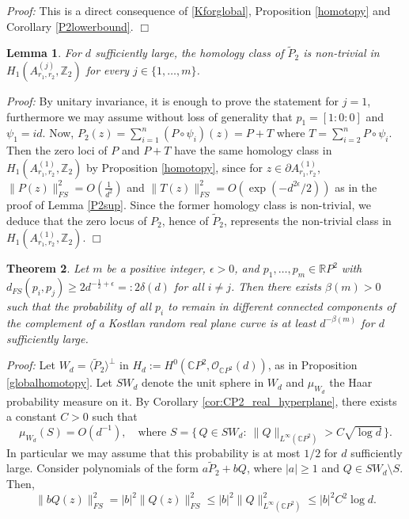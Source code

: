 \documentclass [11pt]{amsart}
\newtheorem {theorem}{Theorem}
\newtheorem {lemma}[theorem]{Lemma}
\theoremstyle{remark}
\numberwithin{equation}{section}
\numberwithin{theorem}{section}
\begin{document}
\noindent\textit{Proof:} This is a direct consequence of \eqref{Kforglobal}, Proposition \ref{homotopy}  and Corollary \ref{P2lowerbound}. \hfill $\Box$ 

\begin{lemma} \label{nontrivial}
For $d$ sufficiently large, the homology class of $\widetilde{P}_{2}$ is non-trivial in $H_{1}(A^{(j)}_{r_{1},r_{2}},\mathbb{Z}_{2})$ for every $j\in \{1,\ldots,m\}$. 
\end{lemma}

\noindent\textit{Proof:} By unitary invariance, it is enough to prove the statement for $j=1$, furthermore we may assume without loss of generality that $p_{1}=[1:0:0]$ and $\psi_{1}=id$. Now, $\displaystyle{P_{2}(z)=\sum_{i=1}^{n} (P\circ \psi_{i})(z)=P+T}$ where $\displaystyle{T=\sum_{i=2}^{n} P\circ \psi_{i}}$. Then the zero loci of $P$ and $P+T$ have the same homology class in $H_{1}(A^{(1)}_{r_{1},r_{2}},\mathbb{Z}_{2})$ by Proposition \ref{homotopy}, since for $z\in \partial A^{(1)}_{r_{1},r_{2}}$, $\displaystyle{\|P(z)\|_{FS}^2=O\left(\frac{1}{d^2}\right)}$ and $\displaystyle{\|T(z)\|_{FS}^2=O\left(\exp(-d^{2\epsilon}/2)\right)}$ as in the proof of Lemma \ref{P2sup}. Since the former homology class is non-trivial, we deduce that the zero locus of $P_{2}$, hence of $\widetilde{P}_{2}$, represents the non-trivial class in $H_{1}(A^{(1)}_{r_{1},r_{2}},\mathbb{Z}_{2})$. \hfill $\Box$

\begin{theorem} \label{finitelymanypoints}
Let $m$ be a positive integer, $\epsilon>0$, and $\displaystyle{p_{1},\ldots,p_{m}\in \mathbb{R}P^2}$ with $\displaystyle{d_{FS}(p_{i},p_{j})\geq 2d^{-\frac{1}{2}+\epsilon}=:2\delta(d)}$ for all $i\neq j$. Then there exists $\beta(m)>0$ such that the probability of all $p_{i}$ to remain in different connected components of the complement of a Kostlan random real plane curve is at least $\displaystyle{d^{-\beta(m)}}$ for $d$ sufficiently large. 
\end{theorem}

\noindent \textit{Proof:} Let $W_{d}=\langle \widetilde{P}_{2}\rangle^{\perp}$ in $H_d:=H^0(\mathbb{C}P^2,\mathcal{O}_{\mathbb{C}P^2}(d))$, as in Proposition \ref{globalhomotopy}. Let $SW_{d}$ denote the unit sphere in $W_{d}$ and $\mu_{W_{d}}$ the Haar probability measure on it. By Corollary \ref{cor:CP2_real_hyperplane}, there exists a constant $C>0$ such that 
\[ \mu_{W_d}(S)
=O(d^{-1}), \quad \mathrm{where}\, \, S=\Big\{\,Q\in SW_d:\ \|Q\|_{L^\infty(\mathbb{C}P^2)}
> C\sqrt{\log d}\,\Big\}.
\]
In particular we may assume that this probability is at most $\displaystyle{1/2}$ for $d$ sufficiently large. Consider polynomials of the form $a\widetilde{P}_{2}+bQ$, where $|a|\geq 1$ and $Q\in SW_{d}\setminus S$. Then, 
\[\|bQ(z)\|_{FS}^2= |b|^2\|Q(z)\|_{FS}^2\leq |b|^2 \|Q\|_{L^\infty(\mathbb{C}P^2)}^2 \leq |b|^2 C^2\log d. \] 
\end{document}

